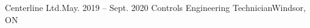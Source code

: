 \resumeSubheading
{Centerline Ltd.}{May. 2019 -- Sept. 2020}
{Controls Engineering Technician}{Windsor, ON}
\resumeItemListStart
{}
\resumeItemListEnd